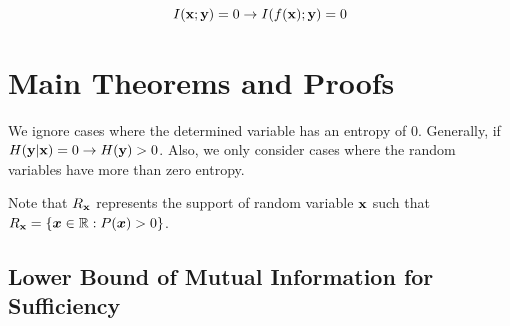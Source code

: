 $$
I({\mathbf{x}}; {\mathbf{y}}) = 0 \rightarrow I(f({\mathbf{x}});{\mathbf{y}}) = 0
$$

\section{Main Theorems and Proofs}
\label{app:domain_mainproofs}

We ignore cases where the determined variable has an entropy of 0. Generally, if $H({\mathbf{y}}| {\mathbf{x}}) = 0 \rightarrow H({\mathbf{y}}) > 0$. Also, we only consider cases where the random variables have more than zero entropy.

Note that $R_{{\mathbf{x}}}$ represents the support of random variable ${\mathbf{x}}$ such that $R_{{\mathbf{x}}} = \{{\bm{x}} \in \mathbb{R} : P({\bm{x}}) > 0\}$.

\subsection{Lower Bound of Mutual Information for Sufficiency}
